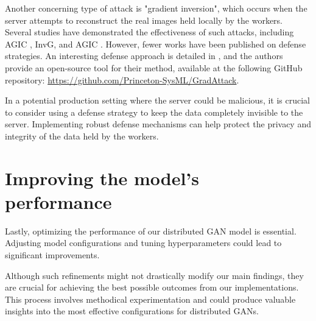 Another concerning type of attack is "gradient inversion", which occurs when the server attempts to reconstruct the real images held locally by the workers. Several studies have demonstrated the effectiveness of such attacks, including AGIC \cite{wang2020sapag}, InvG, and AGIC \cite{9996844}. However, fewer works have been published on defense strategies. An interesting defense approach is detailed in \cite{huang2021evaluating}, and the authors provide an open-source tool for their method, available at the following GitHub repository: \url{https://github.com/Princeton-SysML/GradAttack}.

In a potential production setting where the server could be malicious, it is crucial to consider using a defense strategy to keep the data completely invisible to the server. Implementing robust defense mechanisms can help protect the privacy and integrity of the data held by the workers.




\section{Improving the model's performance}
Lastly, optimizing the performance of our distributed GAN model is essential. Adjusting model configurations and tuning hyperparameters could lead to significant improvements. 

Although such refinements might not drastically modify our main findings, they are crucial for achieving the best possible outcomes from our implementations. This process involves methodical experimentation and could produce valuable insights into the most effective configurations for distributed GANs.